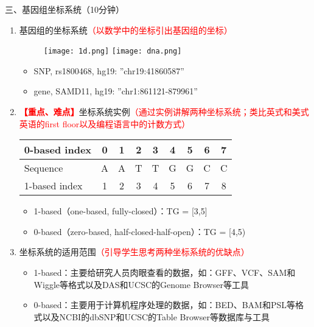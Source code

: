 \documentclass{TIJMUjiaoanLL}
\begin{document}
\vspace*{0.2cm}
\noindent
三、基因组坐标系统（10分钟）
\begin{enumerate}
  \item 基因组的坐标系统\textcolor{red}{（以数学中的坐标引出基因组的坐标）}
    \begin{figure}[h]
    \centering
      \texttt{[image: 1d.png]}
      \hspace*{0.2cm}
      \texttt{[image: dna.png]}
    \end{figure}
    \begin{itemize}
      \item SNP, rs1800468, hg19: ''chr19:41860587''
      \item gene, SAMD11, hg19: ''chr1:861121-879961''
    \end{itemize}
  \item \textcolor{red}{\textbf{【重点、难点】}}坐标系统实例\textcolor{red}{（通过实例讲解两种坐标系统；类比英式和美式英语的first floor以及编程语言中的计数方式）}
    \begin{table}[h]
    \hspace*{2cm}
    \begin{tabular}{lcccccccc}
      \hline
      0-based index & 0 & 1 & 2 & 3 & 4 & 5 & 6 & 7\\
      \hline
      Sequence & A & A & T & T & G & G & C & C\\
      \hline
      1-based index & 1 & 2 & 3 & 4 & 5 & 6 & 7 & 8\\
      \hline
    \end{tabular}
  \end{table}
  \begin{itemize}
    \item 1-based（one-based, fully-closed）：TG = [3,5]
    \item 0-based（zero-based, half-closed-half-open）：TG = [4,5)
  \end{itemize}
  \item 坐标系统的适用范围\textcolor{red}{（引导学生思考两种坐标系统的优缺点）}
    \begin{itemize}
      \item 1-based：主要给研究人员肉眼查看的数据，如：GFF、VCF、SAM和Wiggle等格式以及DAS和UCSC的Genome Browser等工具
      \item 0-based：主要用于计算机程序处理的数据，如：BED、BAM和PSL等格式以及NCBI的dbSNP和UCSC的Table Browser等数据库与工具
    \end{itemize}
\end{enumerate}
\end{document}

